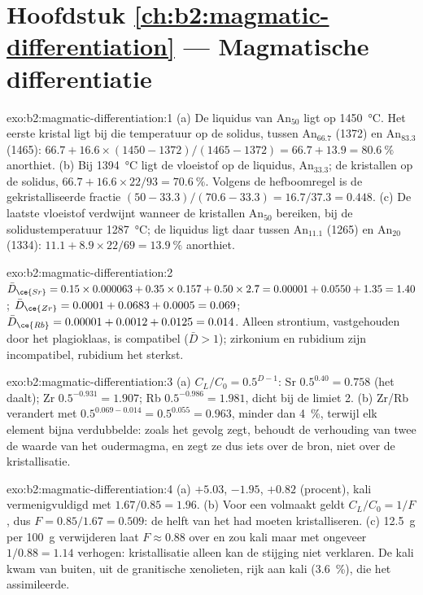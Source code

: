 \section*{Hoofdstuk \ref{ch:b2:magmatic-differentiation} --- Magmatische differentiatie}

\begin{solution}{exo:b2:magmatic-differentiation:1}
(a) De liquidus van An$_{50}$ ligt op \qty{1450}{\celsius}. Het eerste kristal ligt bij die
temperatuur op de solidus, tussen An$_{66.7}$ (1372) en An$_{83.3}$ (1465):
$66.7 + 16.6\times(1450 - 1372)/(1465 - 1372) = 66.7 + 13.9 = \qty{80.6}{\percent}$
anorthiet. (b) Bij \qty{1394}{\celsius} ligt de vloeistof op de liquidus,
An$_{33.3}$; de kristallen op de solidus, $66.7 + 16.6\times22/93 =
\qty{70.6}{\percent}$. Volgens de hefboomregel is de gekristalliseerde fractie $(50 -
33.3)/(70.6 - 33.3) = 16.7/37.3 = 0.448$. (c) De laatste vloeistof verdwijnt wanneer de
kristallen An$_{50}$ bereiken, bij de solidustemperatuur \qty{1287}{\celsius}; de
liquidus ligt daar tussen An$_{11.1}$ (1265) en An$_{20}$ (1334): $11.1 +
8.9\times22/69 = \qty{13.9}{\percent}$ anorthiet.
\end{solution}

\begin{solution}{exo:b2:magmatic-differentiation:2}
$\bar D_{\ce{Sr}} = 0.15\times0.000063 + 0.35\times0.157 + 0.50\times2.7 = 0.00001 +
0.0550 + 1.35 = 1.40$; $\bar D_{\ce{Zr}} = 0.0001 + 0.0683 + 0.0005 = 0.069$;
$\bar D_{\ce{Rb}} = 0.00001 + 0.0012 + 0.0125 = 0.014$. Alleen strontium, vastgehouden door het
plagioklaas, is compatibel ($\bar D > 1$); zirkonium en rubidium zijn incompatibel,
rubidium het sterkst.
\end{solution}

\begin{solution}{exo:b2:magmatic-differentiation:3}
(a) $C_L/C_0 = 0.5^{D-1}$: Sr $0.5^{0.40} = 0.758$ (het daalt); Zr $0.5^{-0.931} =
1.907$; Rb $0.5^{-0.986} = 1.981$, dicht bij de limiet 2. (b) Zr/Rb verandert met
$0.5^{0.069 - 0.014} = 0.5^{0.055} = 0.963$, minder dan \qty{4}{\percent}, terwijl elk
element bijna verdubbelde: zoals het gevolg zegt, behoudt de verhouding van twee  de waarde van het oudermagma, en zegt ze dus iets over de bron, niet
over de kristallisatie.
\end{solution}

\begin{solution}{exo:b2:magmatic-differentiation:4}
(a)  $+5.03$,  $-1.95$,  $+0.82$ (procent), kali
vermenigvuldigd met $1.67/0.85 = 1.96$. (b) Voor een volmaakt  geldt
$C_L/C_0 = 1/F$, dus $F = 0.85/1.67 = 0.509$: de helft van het  had moeten
kristalliseren. (c) \qty{12.5}{g} per \qty{100}{g} verwijderen laat $F \approx 0.88$ over en
zou kali maar met ongeveer $1/0.88 = 1.14$ verhogen: kristallisatie alleen kan de
stijging niet verklaren. De kali kwam van buiten, uit de granitische xenolieten, rijk aan
kali (\qty{3.6}{\percent}), die het  assimileerde.
\end{solution}

